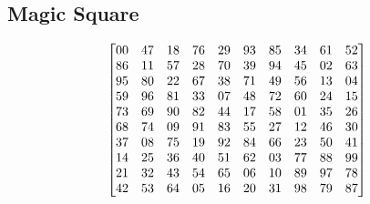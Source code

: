 \subsection{Magic Square}

\[\left [
\begin{matrix}
00	&47	&18	&76	&29	&93	&85      &34      &61      &52     \cr
86	&11	&57	&28	&70	&39	&94      &45      &02      &63     \cr
95	&80	&22	&67	&38	&71	&49      &56      &13      &04     \cr
59	&96	&81	&33	&07	&48	&72      &60      &24      &15     \cr
73	&69	&90	&82	&44	&17	&58      &01      &35      &26     \cr
68	&74	&09	&91	&83	&55	&27      &12      &46      &30     \cr
37	&08	&75	&19	&92	&84	&66      &23      &50      &41     \cr
14	&25	&36	&40	&51	&62	&03      &77      &88      &99     \cr
21	&32	&43	&54	&65	&06	&10      &89      &97      &78     \cr
42	&53	&64	&05	&16	&20	&31      &98      &79      &87     \cr
\end{matrix}
\right ] \]